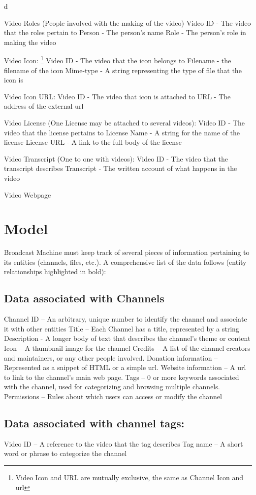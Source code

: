 d\documentclass[a4paper,12pt]{report}
\begin{document}
{{Video Roles (People involved with the making of the video)
	Video ID - The video that the roles pertain to
	Person - The person's name
	Role - The person's role in making the video

Video Icon:
\footnote{Video Icon and URL are mutually exclusive, the same as Channel Icon and url}
	Video ID - The video that the icon belongs to
	Filename - the filename of the icon
	Mime-type - A string representing the type of file that the icon is

Video Icon URL:
	Video ID - The video that icon is attached to
	URL - The address of the external url

Video License (One License may be attached to several videos):
	Video ID - The video that the license pertains to
	License Name - A string for the name of the license
	License URL - A link to the full body of the license

Video Transcript (One to one with videos):
	Video ID - The video that the transcript describes
	Transcript - The written account of what happens in the video

Video Webpage
	

\section{Model}
Broadcast Machine must keep track of  several pieces of information pertaining to its entities (channels, files, etc.). 
A comprehensive list of the data follows (entity relationships highlighted in bold):

\subsection{Data associated with Channels}
Channel ID – An arbitrary, unique number to identify the channel and  associate it with other entities
Title – Each Channel has a title, represented by a string
Description - A longer body of text that describes the channel's theme or content
Icon – A thumbnail image for the channel
Credits – A list of the channel creators and maintainers, or any other people involved. 
Donation information – Represented as a snippet of HTML or a simple url.
Website information – A url to link to the channel's main web page.
Tags – 0 or more keywords associated with the channel, used for categorizing and browsing multiple channels.
Permissions – Rules about which users can access or modify the channel

\subsection{Data associated with channel tags:}
Video ID – A reference to the video that the tag describes
Tag name – A short word or phrase to categorize the channel

}}
\end{document}
